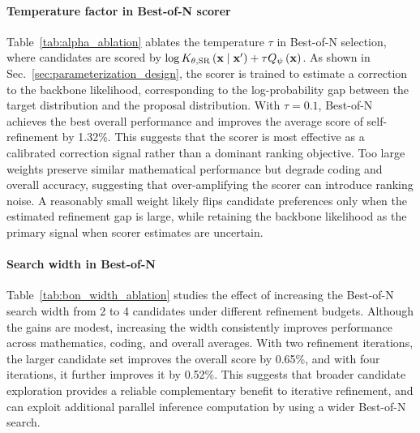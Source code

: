 \paragraph{Temperature factor in Best-of-N scorer}
Table~\ref{tab:alpha_ablation} ablates the temperature $\tau$ in Best-of-N selection, where candidates are scored by $\log K_{\theta,\mathrm{SR}}\left(\mathbf{x}\mid\mathbf{x}'\right)+\tau Q_\psi\left(\mathbf{x}\right)$. 
As shown in Sec.~\ref{sec:parameterization_design}, the scorer is trained to estimate a correction to the backbone likelihood, corresponding to the log-probability gap between the target  distribution and the proposal distribution. 
With $\tau=0.1$, Best-of-N achieves the best overall performance and improves the average score of self-refinement by 1.32\%.
This suggests that the scorer is most effective as a calibrated correction signal rather than a dominant ranking objective. 
Too large weights preserve similar mathematical performance but degrade coding and overall accuracy, suggesting that over-amplifying the scorer can introduce ranking noise. 
A reasonably small weight likely flips candidate preferences only when the estimated refinement gap is large, while retaining the backbone likelihood as the primary signal when scorer estimates are uncertain.


\paragraph{Search width in Best-of-N}
Table~\ref{tab:bon_width_ablation} studies the effect of increasing the Best-of-N search width from 2 to 4 candidates under different refinement budgets. 
Although the gains are modest, increasing the width consistently improves performance across mathematics, coding, and overall averages. 
With two refinement iterations, the larger candidate set improves the overall score by 0.65\%, and with four iterations, it further improves it by 0.52\%. 
This suggests that broader candidate exploration provides a reliable complementary benefit to iterative refinement, and \method can exploit additional parallel inference computation by using a wider Best-of-N search.

